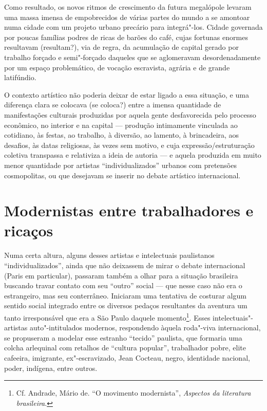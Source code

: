 Como resultado, os novos ritmos de crescimento da futura megalópole
levaram uma massa imensa de empobrecidos de várias partes do mundo a se
amontoar numa cidade com um projeto urbano precário para integrá"-los.
Cidade governada por poucas famílias podres de ricas de barões do café,
cujas fortunas enormes resultavam (resultam?), via de
regra, da acumulação de capital gerado por trabalho
forçado e semi"-forçado daqueles que se aglomeravam desordenadamente por
um espaço problemático, de vocação escravista, agrária e de grande
latifúndio.

O contexto artístico não poderia deixar de estar ligado a essa situação,
e uma diferença clara se colocava (se coloca?) entre a imensa quantidade
de manifestações culturais produzidas por aquela gente desfavorecida
pelo processo econômico, no interior e na capital --- produção
intimamente vinculada ao cotidiano, às festas, ao trabalho, à diversão,
ao lamento, à brincadeira, aos desafios, às datas religiosas, às vezes
sem motivo, e cuja expressão/estruturação coletiva transpassa e
relativiza a ideia de autoria --- e aquela produzida em muito menor
quantidade por artistas ``individualizados'' urbanos com pretensões
cosmopolitas, ou que desejavam se inserir no debate artístico
internacional.

\section*{Modernistas entre trabalhadores e ricaços}

Numa certa altura, alguns desses artistas e intelectuais paulistanos ``individualizados'', ainda que
não deixassem de mirar o debate internacional (Paris em particular),
passaram também a olhar para a situação brasileira buscando travar
contato com seu ``outro'' social --- que nesse caso não era o
estrangeiro, mas seu conterrâneo. Iniciaram uma tentativa de costurar
algum sentido social integrado entre os diversos pedaços resultantes da
aventura um tanto irresponsável que era a São Paulo daquele
momento\footnote{Cf. Andrade, Mário de. ``O movimento modernista'',
  \emph{Aspectos da literatura brasileira}.}. Esses
intelectuais"-artistas auto"-intitulados modernos, respondendo àquela
roda"-viva internacional, se propuseram a modelar esse estranho
``tecido'' paulista, que formaria uma colcha arlequinal com retalhos de ``cultura
popular'', trabalhador pobre, elite cafeeira, imigrante, ex"-escravizado,
Jean Cocteau, negro, identidade nacional, poder, indígena, entre outros.

